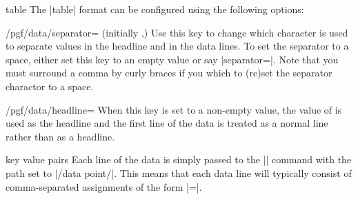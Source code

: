 \begin{dataformat}{table}
  The |table| format can be configured using the following options:
  \begin{key}{/pgf/data/separator= (initially ,)}
    Use this key to change which character is used to separate values
    in the headline and in the data lines. To set the separator to a
    space, either set this key to an empty value or say
    |separator=\space|. Note that you must surround a comma by curly
    braces if you which to (re)set the separator charactor to a space.
    \begin{codeexample}[]
    \end{codeexample}
  \end{key}
  \begin{key}{/pgf/data/headline=}
    When this key is set to a non-empty value, the value of
     is used as the headline and the first line of the
    data is treated as a normal line rather than as a headline.
    \begin{codeexample}[]
    \end{codeexample}
  \end{key}  
\end{dataformat}


\begin{dataformat}{key value pairs}
  Each line of the data is simply passed to the |\pgfkeys| command
  with the path set to |/data point/|. This means that each data line
  will typically consist of comma-separated assignments of the form
  |=|.
  \begin{codeexample}[]
  \end{codeexample}  
\end{dataformat}


